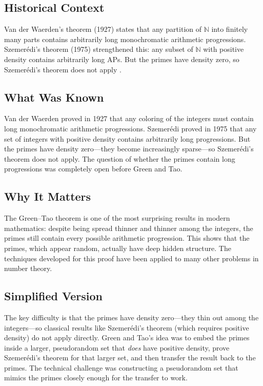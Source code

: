 \subsection{Historical Context}
Van der Waerden's theorem (1927) states that any partition of $\mathbb{N}$ into finitely many parts contains arbitrarily long monochromatic arithmetic progressions. Szemer\'edi's theorem (1975) strengthened this: any subset of $\mathbb{N}$ with positive density contains arbitrarily long APs. But the primes have density zero, so Szemer\'edi's theorem does not apply \cite{vdW1927, szemeredi1975}.

\subsection{What Was Known}
Van der Waerden proved in 1927 that any coloring of the integers must contain long monochromatic arithmetic progressions. Szemer\'edi proved in 1975 that any set of integers with positive density contains arbitrarily long progressions. But the primes have density zero---they become increasingly sparse---so Szemer\'edi's theorem does not apply. The question of whether the primes contain long progressions was completely open before Green and Tao.

\subsection{Why It Matters}
The Green--Tao theorem is one of the most surprising results in modern mathematics: despite being spread thinner and thinner among the integers, the primes still contain every possible arithmetic progression. This shows that the primes, which appear random, actually have deep hidden structure. The techniques developed for this proof have been applied to many other problems in number theory.

\subsection{Simplified Version}
The key difficulty is that the primes have density zero---they thin out among the integers---so classical results like Szemer\'edi's theorem (which requires positive density) do not apply directly. Green and Tao's idea was to embed the primes inside a larger, pseudorandom set that \emph{does} have positive density, prove Szemer\'edi's theorem for that larger set, and then transfer the result back to the primes. The technical challenge was constructing a pseudorandom set that mimics the primes closely enough for the transfer to work.

